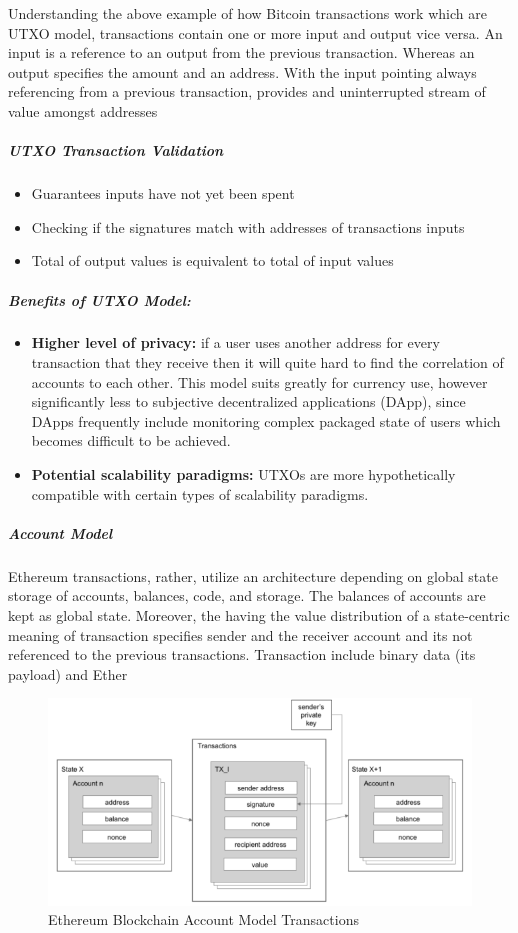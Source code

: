Understanding the above example of how Bitcoin transactions work which are UTXO model, transactions contain one or more input and output vice versa. An input is a reference to an output from the previous transaction. Whereas an output specifies the amount and an address. With the input pointing always referencing from a previous transaction, provides and uninterrupted stream of value amongst addresses

\subparagraph{UTXO Transaction Validation}
\begin{itemize}
\item Guarantees inputs have not yet been spent 
\item Checking if the signatures match with addresses of transactions inputs 
\item Total of output values is equivalent to total of input values 
\end{itemize}


\subparagraph{Benefits of UTXO Model:}
\begin{itemize}
\item \textbf{Higher level of privacy:} if a user uses another address for every transaction that they receive then it will quite hard to find the correlation of accounts to each other. This model suits greatly for currency use, however significantly less to subjective decentralized applications (DApp), since DApps frequently include monitoring complex packaged state of users which becomes difficult to be achieved.  
\item \textbf{Potential scalability paradigms:} UTXOs are more hypothetically compatible with certain types of scalability paradigms.
\end{itemize}

\subparagraph{Account Model}

Ethereum transactions, rather, utilize an architecture depending on global state storage of accounts, balances, code, and storage. The balances of accounts are kept as global state. Moreover, the having the value distribution of a state-centric meaning of transaction specifies sender and the receiver account and its not referenced to the previous transactions. Transaction include binary data (its payload) and Ether

\begin{figure}[h]
\centering
\includegraphics[width=1.0\textwidth]{images/account_model.png}
\caption{\label{fig:account model}Ethereum Blockchain Account Model Transactions}
\end{figure}


